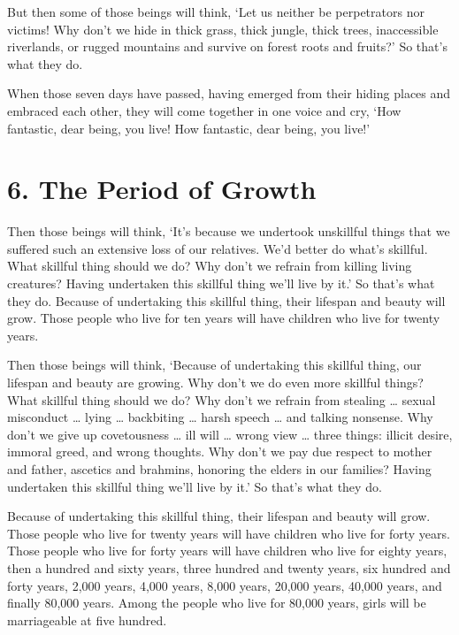 \documentclass[12pt,openany]{book}%
\begin{document}
But then some of those beings will think, ‘Let us neither be perpetrators nor victims! Why don’t we hide in thick grass, thick jungle, thick trees, inaccessible riverlands, or rugged mountains and survive on forest roots and fruits?’ So that’s what they do. 

When those seven days have passed, having emerged from their hiding places and embraced each other, they will come together in one voice and cry, ‘How fantastic, dear being, you live! How fantastic, dear being, you live!’ 

\section*{6. The Period of Growth }

Then those beings will think, ‘It’s because we undertook unskillful things that we suffered such an extensive loss of our relatives. We’d better do what’s skillful. What skillful thing should we do? Why don’t we refrain from killing living creatures? Having undertaken this skillful thing we’ll live by it.’ So that’s what they do. Because of undertaking this skillful thing, their lifespan and beauty will grow. Those people who live for ten years will have children who live for twenty years. 

Then those beings will think, ‘Because of undertaking this skillful thing, our lifespan and beauty are growing. Why don’t we do even more skillful things? What skillful thing should we do? Why don’t we refrain from stealing … sexual misconduct … lying … backbiting … harsh speech … and talking nonsense. Why don’t we give up covetousness … ill will … wrong view … three things: illicit desire, immoral greed, and wrong thoughts. Why don’t we pay due respect to mother and father, ascetics and brahmins, honoring the elders in our families? Having undertaken this skillful thing we’ll live by it.’ So that’s what they do. 

Because of undertaking this skillful thing, their lifespan and beauty will grow. Those people who live for twenty years will have children who live for forty years. Those people who live for forty years will have children who live for eighty years, then a hundred and sixty years, three hundred and twenty years, six hundred and forty years, 2,000 years, 4,000 years, 8,000 years, 20,000 years, 40,000 years, and finally 80,000 years. Among the people who live for 80,000 years, girls will be marriageable at five hundred. 
\end{document}
